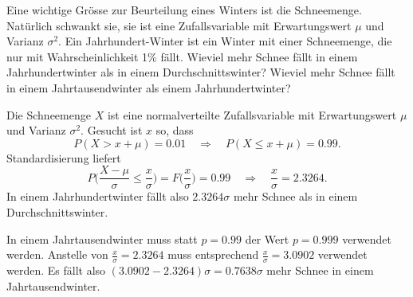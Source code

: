 Eine wichtige Grösse zur Beurteilung eines Winters ist die Schneemenge.
Natürlich schwankt sie, sie ist eine Zufallsvariable mit
Erwartungswert $\mu$ und Varianz $\sigma^2$.
Ein Jahrhundert-Winter ist ein Winter mit einer Schneemenge, die nur
mit Wahrscheinlichkeit 1\% fällt. Wieviel mehr Schnee fällt in einem
Jahrhundertwinter als in einem Durchschnittswinter? Wieviel mehr
Schnee fällt in einem Jahrtausendwinter als einem Jahrhundertwinter?

\begin{loesung}
Die Schneemenge $X$ ist eine normalverteilte Zufallsvariable mit
Erwartungswert $\mu$ und Varianz $\sigma^2$. Gesucht ist $x$ so,
dass
\[ 
P(X > x+\mu) = 0.01\quad\Rightarrow\quad
P(X\le x+\mu) =0.99.
\]
Standardisierung liefert
\[
P\biggl(\frac{X-\mu}{\sigma}\le \frac{x}{\sigma}\biggr)=F\biggl(\frac{x}{\sigma}\biggr)=0.99
\quad\Rightarrow\quad \frac{x}{\sigma}=2.3264.
\]
In einem Jahrhundertwinter fällt also $2.3264\sigma$ mehr Schnee als
in einem Durchschnittswinter.

In einem Jahrtausendwinter muss statt $p=0.99$ der Wert $p=0.999$
verwendet werden. Anstelle von $\frac{x}{\sigma}=2.3264$ muss entsprechend
$\frac{x}{\sigma}=3.0902$ verwendet
werden. Es fällt also $(3.0902-2.3264)\sigma = 0.7638\sigma$
mehr Schnee in einem Jahrtausendwinter.
\end{loesung}

